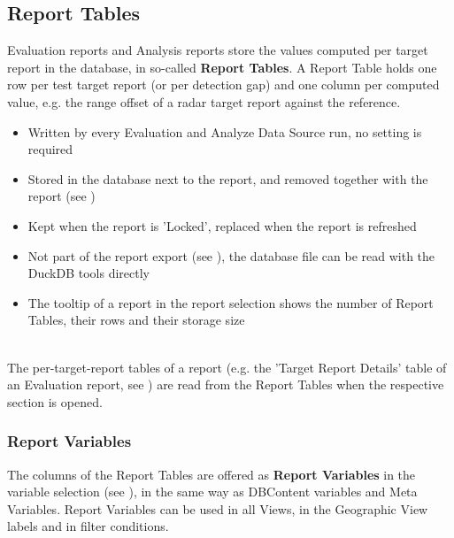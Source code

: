 \subsection{Report Tables}
\label{sec:report_tables}

Evaluation reports and Analysis reports store the values computed per target report in the database, in so-called \textbf{Report Tables}. 
A Report Table holds one row per test target report (or per detection gap) and one column per computed value, 
e.g. the range offset of a radar target report against the reference. \\

\begin{itemize}
\item Written by every Evaluation and Analyze Data Source run, no setting is required
\item Stored in the database next to the report, and removed together with the report (see )
\item Kept when the report is 'Locked', replaced when the report is refreshed
\item Not part of the report export (see ), the database file can be read with the DuckDB tools directly
\item The tooltip of a report in the report selection shows the number of Report Tables, their rows and their storage size
\end{itemize}
\ \\

The per-target-report tables of a report (e.g. the 'Target Report Details' table of an Evaluation report, see ) 
are read from the Report Tables when the respective section is opened. \\

\subsubsection{Report Variables}
\label{sec:report_variables}

The columns of the Report Tables are offered as \textbf{Report Variables} in the variable selection (see ), 
in the same way as DBContent variables and Meta Variables. Report Variables can be used in all Views, in the Geographic View labels and in filter conditions. \\

